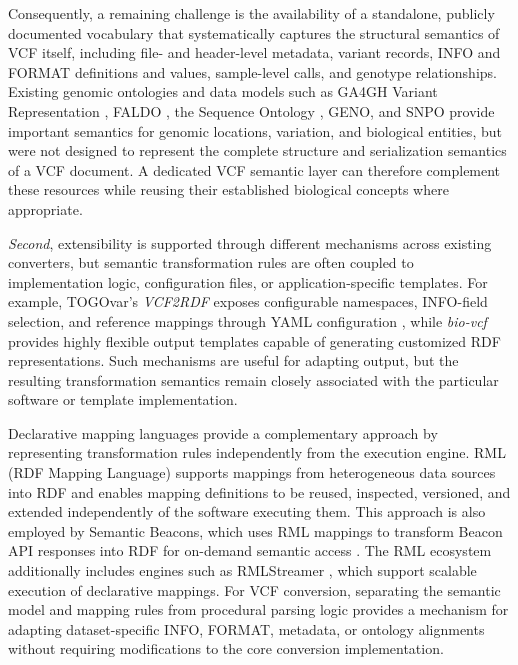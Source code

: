 \documentclass[pdflatex,sn-mathphys-num]{sn-jnl}%
\theoremstyle{thmstyleone}%
\theoremstyle{thmstyletwo}%
\theoremstyle{thmstylethree}%
\begin{document}
Consequently, a remaining challenge is the availability of a standalone, publicly documented vocabulary that systematically captures the structural semantics of VCF itself, including file- and header-level metadata, variant records, INFO and FORMAT definitions and values, sample-level calls, and genotype relationships.
Existing genomic ontologies and data models such as GA4GH Variant Representation \cite{ga4gh_varschema_2021}, FALDO \cite{faldo_2016}, the Sequence Ontology \cite{seq_ont_2005}, GENO, and SNPO provide important semantics for genomic locations, variation, and biological entities, but were not designed to represent the complete structure and serialization semantics of a VCF document.
A dedicated VCF semantic layer can therefore complement these resources while reusing their established biological concepts where appropriate.

\textit{Second}, extensibility is supported through different mechanisms across existing converters, but semantic transformation rules are often coupled to implementation logic, configuration files, or application-specific templates.
For example, TOGOvar's \textit{VCF2RDF} exposes configurable namespaces, INFO-field selection, and reference mappings through YAML configuration \cite{togovar_2022}, while \textit{bio-vcf} provides highly flexible output templates capable of generating customized RDF representations.
Such mechanisms are useful for adapting output, but the resulting transformation semantics remain closely associated with the particular software or template implementation.

Declarative mapping languages provide a complementary approach by representing transformation rules independently from the execution engine.
RML (RDF Mapping Language) \cite{rml_2024} supports mappings from heterogeneous data sources into RDF and enables mapping definitions to be reused, inspected, versioned, and extended independently of the software executing them.
This approach is also employed by Semantic Beacons, which uses RML mappings to transform Beacon API responses into RDF for on-demand semantic access \cite{semantic_beac_2025}.
The RML ecosystem additionally includes engines such as RMLStreamer \cite{rmlstreamer_2022}, which support scalable execution of declarative mappings.
For VCF conversion, separating the semantic model and mapping rules from procedural parsing logic provides a mechanism for adapting dataset-specific INFO, FORMAT, metadata, or ontology alignments without requiring modifications to the core conversion implementation.
\end{document}
